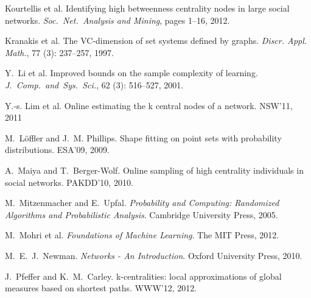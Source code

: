 \begin{thebibliography}{35}
Kourtellis et al.
\newblock Identifying high betweenness centrality nodes in large social
  networks.
\newblock \emph{Soc.~Net.~Analysis and Mining}, pages 1--16, 2012.

Kranakis et al.
\newblock The {VC}-dimension of set systems defined by graphs.
\newblock \emph{Discr. Appl. Math.}, 77 (3):
  237--257, 1997.

Y.~Li et al.
\newblock Improved bounds on the sample complexity of learning.
\newblock \emph{J.~Comp.~and~Sys.~Sci.}, 62
  (3): 516--527, 2001.

Y.-s. Lim et al.
\newblock Online estimating the k central nodes of a network.
\newblock NSW'11, 2011

M.~L\"{o}ffler and J.~M. Phillips.
\newblock Shape fitting on point sets with probability distributions.
\newblock ESA'09, 2009.

A.~Maiya and T.~Berger-Wolf.
\newblock Online sampling of high centrality individuals in social networks.
\newblock PAKDD'10, 2010.

M.~Mitzenmacher and E.~Upfal.
\newblock \emph{Probability and Computing: Randomized Algorithms and
  Probabilistic Analysis}.
\newblock Cambridge University Press, 2005.

M.~Mohri et al.
\newblock \emph{Foundations of Machine Learning}.
\newblock The MIT Press, 2012.

M.~E.~J.~Newman.
\newblock \emph{Networks - An Introduction}.
\newblock Oxford University Press, 2010.

J.~Pfeffer and K.~M.~Carley.
\newblock k-centralities: local approximations of global measures based on
  shortest paths.
\newblock WWW'12, 2012.


\end{thebibliography}
